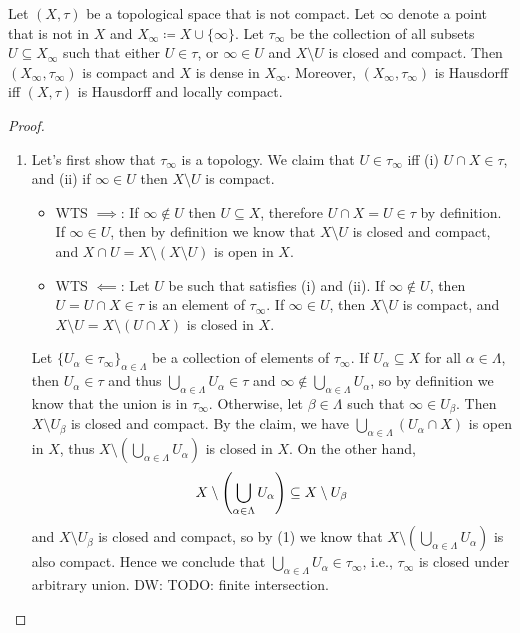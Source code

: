 \documentclass[screen]{techreport}
\numberwithin{equation}{section}
\newcommand{\diw}[1]{{\color{Red} DW: #1}}
\begin{document}
\begin{theorem}\label{The:AlexandroffCompactification}
	Let $(X,\tau)$ be a topological space that is not compact.
	Let $\infty$ denote a point that is not in $X$ and $X_\infty \coloneqq X \cup \{\infty\}$.
	Let $\tau_\infty$ be the collection of all subsets $U \subseteq X_\infty$ such that either $U \in \tau$, or $\infty \in U$ and $X \setminus U$ is closed and compact.
	Then $(X_\infty,\tau_\infty)$ is compact and $X$ is dense in $X_\infty$.
	Moreover, $(X_\infty,\tau_\infty)$ is Hausdorff iff $(X,\tau)$ is Hausdorff and locally compact.
\end{theorem}
\begin{proof}\
	\begin{enumerate}
		\item Let's first show that $\tau_\infty$ is a topology.
		We claim that $U \in \tau_\infty$ iff (i) $U \cap X \in \tau$, and (ii) if $\infty \in U$ then $X \setminus U$ is compact.
		\begin{itemize}
			\item WTS ${\implies}$: If $\infty \not\in U$ then $U \subseteq X$, therefore $U \cap X = U \in \tau$ by definition.
			If $\infty \in U$, then by definition we know that $X \setminus U$ is closed and compact, and $X \cap U = X \setminus (X \setminus U)$ is open in $X$.
			\item WTS $\impliedby$: Let $U$ be such that satisfies (i) and (ii).
			If $\infty \not\in U$, then $U = U \cap X \in \tau$ is an element of $\tau_\infty$.
			If $\infty \in U$, then $X \setminus U$ is compact, and $X \setminus U = X \setminus (U \cap X)$ is closed in $X$.
		\end{itemize}
		Let $\{ U_\alpha \in \tau_\infty\}_{\alpha \in \Lambda}$ be a collection of elements of $\tau_\infty$.
		If $U_\alpha \subseteq X$ for all $\alpha \in \Lambda$, then $U_\alpha \in \tau$ and thus $\bigcup_{\alpha \in \Lambda} U_\alpha \in \tau$ and $\infty \not\in \bigcup_{\alpha \in \Lambda} U_\alpha$, so by definition we know that the union is in $\tau_\infty$.
		Otherwise, let $\beta \in \Lambda$ such that $\infty \in U_\beta$.
		Then $X \setminus U_\beta$ is closed and compact.
		By the claim, we have $\bigcup_{\alpha \in \Lambda} (U_\alpha \cap X)$ is open in $X$, thus $X \setminus (\bigcup_{\alpha \in \Lambda} U_\alpha)$ is closed in $X$.
		On the other hand,
		\[
		X \setminus \left({\bigcup_{\alpha \in \Lambda} U_\alpha}\right) \subseteq X \setminus U_\beta
		\]
		and $X \setminus U_\beta$ is closed and compact, so by (1) we know that $X \setminus (\bigcup_{\alpha \in \Lambda} U_\alpha)$ is also compact.
		Hence we conclude that $\bigcup_{\alpha \in \Lambda} U_\alpha \in \tau_\infty$, i.e., $\tau_\infty$ is closed under arbitrary union.
		\diw{TODO: finite intersection.}
		

\end{enumerate}
\end{proof}
\end{document}
